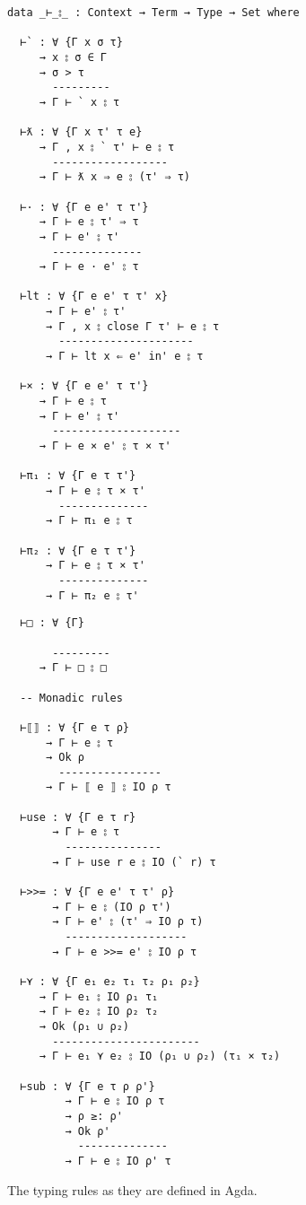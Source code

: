 \begin{listing}
  \begin{multicols}{2}
\begin{verbatim}
data _⊢_⦂_ : Context → Term → Type → Set where

  ⊢` : ∀ {Γ x σ τ}
     → x ⦂ σ ∈ Γ
     → σ > τ
       ---------
     → Γ ⊢ ` x ⦂ τ

  ⊢ƛ : ∀ {Γ x τ' τ e}
     → Γ , x ⦂ ` τ' ⊢ e ⦂ τ
       ------------------
     → Γ ⊢ ƛ x ⇒ e ⦂ (τ' ⇒ τ)

  ⊢· : ∀ {Γ e e' τ τ'}
     → Γ ⊢ e ⦂ τ' ⇒ τ
     → Γ ⊢ e' ⦂ τ'
       --------------
     → Γ ⊢ e · e' ⦂ τ

  ⊢lt : ∀ {Γ e e' τ τ' x}
      → Γ ⊢ e' ⦂ τ'
      → Γ , x ⦂ close Γ τ' ⊢ e ⦂ τ
        ---------------------
      → Γ ⊢ lt x ⇐ e' in' e ⦂ τ

  ⊢× : ∀ {Γ e e' τ τ'}
     → Γ ⊢ e ⦂ τ
     → Γ ⊢ e' ⦂ τ'
       --------------------
     → Γ ⊢ e × e' ⦂ τ × τ'

  ⊢π₁ : ∀ {Γ e τ τ'}
      → Γ ⊢ e ⦂ τ × τ'
        --------------
      → Γ ⊢ π₁ e ⦂ τ

  ⊢π₂ : ∀ {Γ e τ τ'}
      → Γ ⊢ e ⦂ τ × τ'
        --------------
      → Γ ⊢ π₂ e ⦂ τ'
\end{verbatim}
\begin{verbatim}
  ⊢□ : ∀ {Γ}
       
       ---------
     → Γ ⊢ □ ⦂ □

  -- Monadic rules

  ⊢⟦⟧ : ∀ {Γ e τ ρ}
      → Γ ⊢ e ⦂ τ
      → Ok ρ
        ----------------
      → Γ ⊢ ⟦ e ⟧ ⦂ IO ρ τ
      
  ⊢use : ∀ {Γ e τ r}
       → Γ ⊢ e ⦂ τ
         ---------------
       → Γ ⊢ use r e ⦂ IO (` r) τ
  
  ⊢>>= : ∀ {Γ e e' τ τ' ρ}
       → Γ ⊢ e ⦂ (IO ρ τ')
       → Γ ⊢ e' ⦂ (τ' ⇒ IO ρ τ)
         -------------------
       → Γ ⊢ e >>= e' ⦂ IO ρ τ

  ⊢⋎ : ∀ {Γ e₁ e₂ τ₁ τ₂ ρ₁ ρ₂}
     → Γ ⊢ e₁ ⦂ IO ρ₁ τ₁
     → Γ ⊢ e₂ ⦂ IO ρ₂ τ₂
     → Ok (ρ₁ ∪ ρ₂)
       -----------------------
     → Γ ⊢ e₁ ⋎ e₂ ⦂ IO (ρ₁ ∪ ρ₂) (τ₁ × τ₂)

  ⊢sub : ∀ {Γ e τ ρ ρ'}
         → Γ ⊢ e ⦂ IO ρ τ
         → ρ ≥: ρ'
         → Ok ρ'
           --------------
         → Γ ⊢ e ⦂ IO ρ' τ
\end{verbatim}
\end{multicols}
\caption{The typing rules as they are defined in Agda.}\label{lst:typingrules}
\end{listing}
